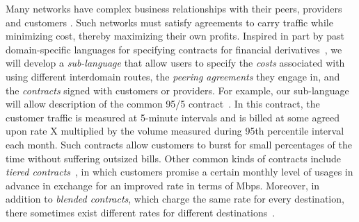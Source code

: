 Many networks have complex business relationships with their peers, providers and 
customers \cite{routingplaybook}.  Such networks must satisfy agreements to carry traffic 
while minimizing
cost, thereby maximizing their own profits. 
%
Inspired in part by past domain-specific languages for specifying contracts for financial derivatives~\cite{spj+:contracts},
we will develop a \emph{sub-language} that allow users to specify the
\emph{costs} associated with using different interdomain routes, the \emph{peering agreements} they
engage in, and the \emph{contracts} signed with customers or providers.  For example,
our sub-language will allow description of the common 95/5 contract~\cite{routingplaybook}.  
In this contract, the customer traffic is measured at 5-minute intervals and is billed at 
some agreed upon rate X multiplied by the
volume measured during 95th percentile interval each month.  Such contracts allow customers to burst for small
percentages of the time without suffering outsized bills.  Other common kinds of contracts include
\emph{tiered contracts}~\cite{tiered-isp-contracts}, in which customers promise a certain monthly level
of usages in advance in exchange for an improved rate in terms of Mbps.  Moreover,
in addition to \emph{blended contracts}, which charge the same rate for every destination,
there sometimes exist different rates for different destinations~\cite{tiered-isp-contracts}.


